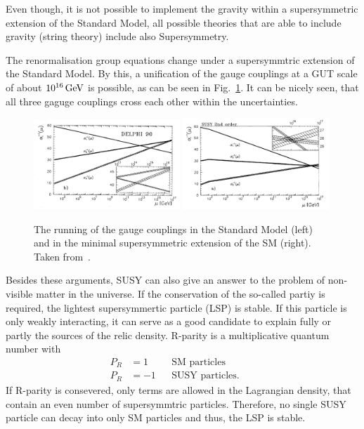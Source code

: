 Even though, it is not possible to implement the gravity within a supersymmetric extension of the Standard Model, all possible theories that are able to include gravity (string theory) include also Supersymmetry.

The renormalisation group equations change under a supersymmtric extension of the Standard Model.
By this, a unification of the gauge couplings at a GUT scale of about $10^{16}\,\text{Ge}\kern-0.06667em\text{V}$ is possible, as can be seen in Fig.~\ref{fig:Unification}.
It can be nicely seen, that all three gaguge couplings cross each other within the uncertainties.
\begin{figure}[b]
  \centering
      \includegraphics[width=0.49\textwidth]{figures/theory/running_couplings_SM}
      \includegraphics[width=0.49\textwidth]{figures/theory/running_couplings_MSSM}
  \caption{The running of the gauge couplings in the Standard Model (left) and in the minimal supersymmetric extension of the SM (right). Taken from~\cite{bib:Unification}.}  
  \label{fig:Unification}
\end{figure}

Besides these arguments, SUSY can also give an answer to the problem of non-visible matter in the universe.
If the conservation of the so-called partiy is required, the lightest supersymmertic particle (LSP) is stable.
If this particle is only weakly interacting, it can serve as a good candidate to explain fully or partly the sources of the relic density. 
R-parity is a multiplicative quantum number with
\begin{align*}
P_R & =  1 &&\text{SM particles}&&\\
P_R & = -1 &&\text{SUSY particles}.&&
\end{align*}
If R-parity is consevered, only terms are allowed in the Lagrangian density, that contain an even number of supersymmtric particles.
Therefore, no single SUSY particle can decay into only SM particles and thus, the LSP is stable.



